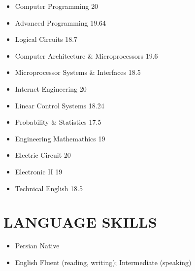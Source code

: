 \documentclass[10pt,a4paper,sans]{moderncv} %
\begin{document}
\begin{multicols}{2} 

	\begin{itemize}
	
		\item Computer Programming               		\hfill{20}  
		\item Advanced Programming                    \hfill{19.64}
		\item Logical Circuits                         \hfill{18.7}
		\item Computer Architecture \& Microprocessors \hfill{19.6}
		\item Microprocessor Systems \& Interfaces		\hfill{18.5}
		\item Internet Engineering						\hfill{20}
		\item Linear Control Systems                   \hfill{18.24}
		\item Probability \& Statistics				\hfill{17.5}  
		\item Engineering Mathemathics               \hfill{19}
		\item Electric Circuit                       	  		\hfill{20}   
		\item Electronic II                              		\hfill{19} 
		\item Technical English                               \hfill{18.5}
	
	\end{itemize}

\end{multicols}

\section{LANGUAGE SKILLS}

\begin{itemize}
	\item Persian \hspace{5 pt} Native
	\item English \hspace{6 pt} Fluent (reading, writing); Intermediate (speaking)
\end{itemize} 
\end{document}
